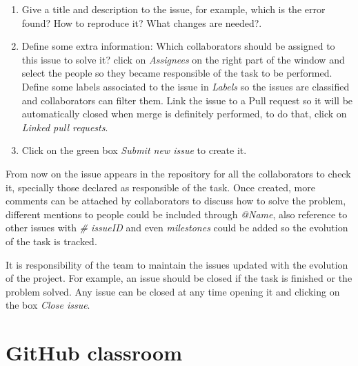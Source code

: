 \begin{enumerate}
\setlength\itemsep{0.0cm}
\item Give a title and description to the issue, for example, which is the error found? How to reproduce it? What changes are needed?.
\item Define some extra information:
    Which collaborators should be assigned to this issue to solve it? click on \textit{Assignees} on the right part of the window and select the people so they became responsible of the task to be performed. 
    Define some labels associated to the issue in \textit{Labels} so the issues are classified and collaborators can filter them. 
    Link the issue to a Pull request so it will be automatically closed when merge is definitely performed, to do that, click on \textit{Linked pull requests}.   
\item Click on the green box \textit{Submit new issue} to create it.
\end{enumerate}

From now on the issue appears in the repository for all the collaborators to check it, specially those declared as responsible of the task. 
Once created, more comments can be attached by collaborators to discuss how to solve the problem, 
different mentions to people could be included through \textit{@Name}, 
also reference to other issues with \textit{\# issueID} and
even \textit{milestones} could be added so the evolution of the task is tracked. 

It is responsibility of the team to maintain the issues updated with the evolution of the project. 
For example, an issue should be closed if the task is finished or the problem solved. 
Any issue can be closed at any time opening it and clicking on the box \textit{Close issue}. 




\section{GitHub classroom}


















